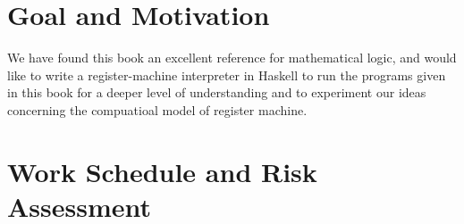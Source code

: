 \documentclass[english]{article}
\begin{document}
\section{Goal and Motivation}
We have found this book an excellent reference for mathematical logic, 
and would like to write a register-machine interpreter in Haskell 
to run the programs given in this book for a deeper level of understanding 
and to experiment our ideas concerning the compuatioal model of register machine.
%
%
\section{Work Schedule and Risk Assessment}
\end{document}
